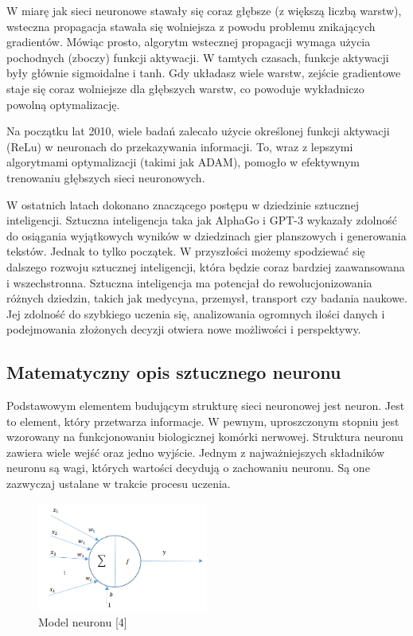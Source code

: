 \documentclass{article}
\begin{document}
W miarę jak sieci neuronowe stawały się coraz głębsze (z większą liczbą warstw), wsteczna propagacja stawała się wolniejsza z powodu problemu znikających gradientów.
Mówiąc prosto, algorytm wstecznej propagacji wymaga użycia pochodnych (zboczy) funkcji aktywacji.
W tamtych czasach, funkcje aktywacji były głównie sigmoidalne i tanh.
Gdy układasz wiele warstw, zejście gradientowe staje się coraz wolniejsze dla głębszych warstw, co powoduje wykładniczo powolną optymalizację.

Na początku lat 2010, wiele badań zalecało użycie określonej funkcji aktywacji (ReLu) w neuronach do przekazywania informacji. To, wraz z lepszymi algorytmami optymalizacji (takimi jak ADAM), pomogło w efektywnym trenowaniu głębszych sieci neuronowych.


W ostatnich latach dokonano znaczącego postępu w dziedzinie sztucznej inteligencji.
Sztuczna inteligencja taka jak AlphaGo i GPT-3 wykazały zdolność do osiągania wyjątkowych wyników w dziedzinach gier planszowych i generowania tekstów. Jednak to tylko początek. W przyszłości możemy spodziewać się dalszego rozwoju sztucznej inteligencji, która będzie coraz bardziej zaawansowana i wszechstronna.
Sztuczna inteligencja ma potencjał do rewolucjonizowania różnych dziedzin, takich jak medycyna, przemysł, transport czy badania naukowe.
Jej zdolność do szybkiego uczenia się, analizowania ogromnych ilości danych i podejmowania złożonych decyzji otwiera nowe możliwości i perspektywy.
\subsection{Matematyczny opis sztucznego neuronu}
Podstawowym elementem budującym strukturę sieci neuronowej jest neuron. Jest to element, który przetwarza informacje.
W pewnym, uproszczonym stopniu jest wzorowany na funkcjonowaniu biologicznej komórki nerwowej.
Struktura neuronu zawiera wiele wejść oraz jedno wyjście.
Jednym z najważniejszych składników neuronu są wagi, których wartości decydują o zachowaniu neuronu. Są one zazwyczaj ustalane w trakcie procesu uczenia.
\begin{figure}[h]
    \centering
    \includegraphics[width=0.5\textwidth]{model_neuronu.png}
    \caption{Model neuronu [4]}
    \label{fig:zdjecie}
\end{figure}
\end{document}
